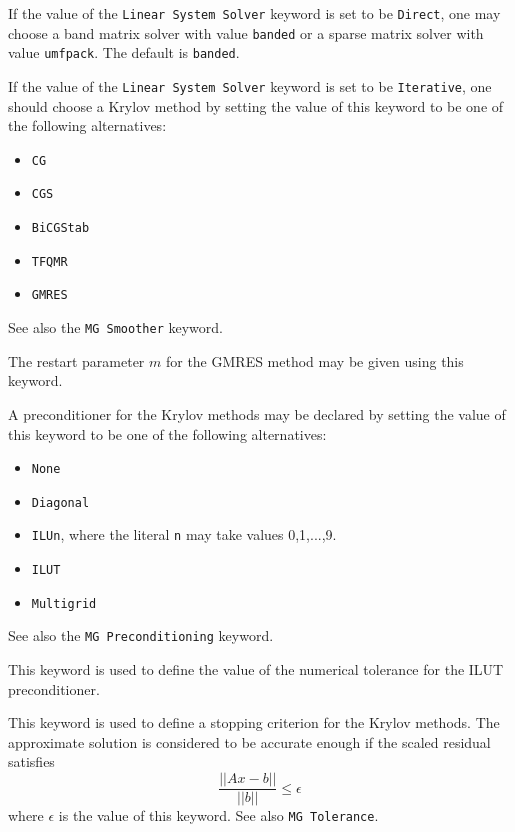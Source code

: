 If the value of the {\tt Linear System Solver} keyword is set to be 
{\tt Direct}, one may choose a band matrix solver with 
value \texttt{banded} or a sparse matrix solver with 
value \texttt{umfpack}. The default is \texttt{banded}.

If the value of the {\tt Linear System Solver} keyword is set to be 
{\tt Iterative}, one should choose a Krylov method by setting the value of this keyword to be 
one of the following alternatives:
\begin{itemize}
\item {\tt CG}
\item {\tt CGS}
\item {\tt BiCGStab}
\item {\tt TFQMR}
\item {\tt GMRES}
\end{itemize}
See also the {\tt MG Smoother} keyword.

The restart parameter $m$ for the GMRES method may be given using this keyword.

A preconditioner for the Krylov methods may be declared by setting the value of this keyword to be 
one of the following alternatives: 
\begin{itemize}
\item {\tt None}
\item {\tt Diagonal}
\item {\tt ILUn}, where the literal {\tt n} may take values 0,1,...,9.
\item {\tt ILUT}
\item {\tt Multigrid}
\end{itemize}
See also the {\tt MG Preconditioning} keyword.

This keyword is used to define the value of 
the numerical tolerance for the ILUT preconditioner.

This keyword is used to define a stopping criterion for the Krylov methods. 
The approximate solution is considered to be accurate enough if the scaled residual satisfies
\begin{equation*}
\frac{|| Ax - b ||}{||b||} \le \epsilon
\end{equation*}
where $\epsilon$ is the value of this keyword.
See also {\tt MG Tolerance}.

